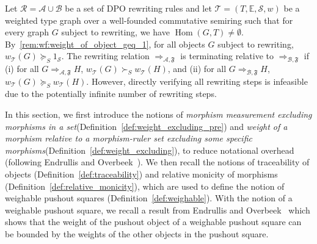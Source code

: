 Let \( \mathcal{R} = \mathcal{A} \cup \mathcal{B} \) be a set of DPO rewriting rules and let $\mathcal{T}=(T,\mathbb{E},\mathcal{S},w)$ be a weighted type graph over a well-founded commutative semiring such that for every graph $G$ subject to rewriting, we have $\operatorname{Hom}(G,T)\neq \emptyset$. By~\autoref{rem:wf:weight_of_object_geq_1}, for all objects \( G \) subject to rewriting, \(w_\mathcal{T}(G) \succeq_S 1_\mathcal{S} \).
The rewriting relation \( \Rightarrow_{\mathcal{A},\mathfrak{F}} \) is terminating relative to $\Rightarrow_{\mathcal{B},\mathfrak{F}}$ if (i) for all \(G \Rightarrow_{\mathcal{A},\mathfrak{F}} H\), \( w_\mathcal{T}(G) \succ_S w_\mathcal{T}(H)\), and (ii) for all \(G \Rightarrow_{\mathcal{B},\mathfrak{F}} H\), \( w_\mathcal{T}(G) \succeq_S w_\mathcal{T}(H) \). However, directly verifying all rewriting steps is infeasible due to the potentially infinite number of rewriting steps.

In this section, we first introduce the notions of \emph{morphism measurement excluding morphisms in a set}(Definition~\ref{def:weight_excluding_pre}) and \emph{weight of a morphism relative to a morphism-ruler set excluding some specific morphisms}(Definition~\ref{def:weight_excluding}),
to reduce notational overhead (following Endrullis and Overbeek~\cite{endrullis2024generalized_icgt}).
We then recall the notions of traceability of objects (Definition~\ref{def:traceability}) and relative monicity of morphisms (Definition~\ref{def:relative_monicity}),
which are used to define the notion of weighable pushout squares (Definition~\ref{def:weighable}). With the notion of a weighable pushout square, we recall a result from Endrullis and Overbeek~\cite{endrullis2024generalized_icgt} which shows that the weight of the pushout object of a weighable pushout square can be bounded by the weights of the other objects in the pushout square.

